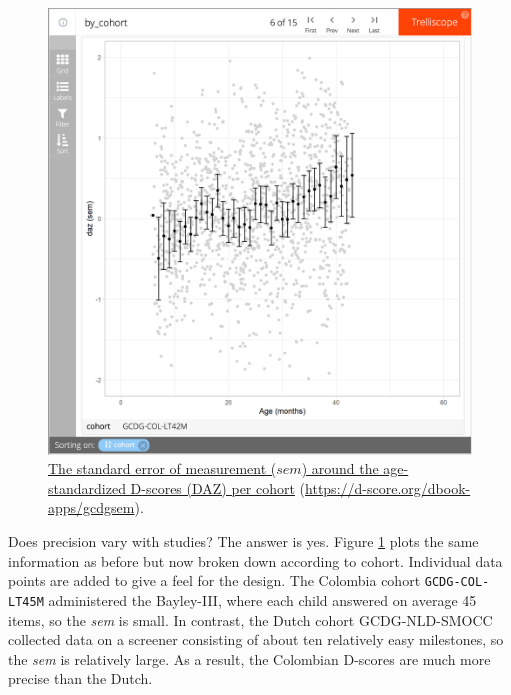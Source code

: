 \documentclass[
]{book}
\begin{document}
\begin{figure}

{\centering \includegraphics[width=1\linewidth]{fig/fig_6.4} 

}

\caption{\href{https://d-score.org/dbook-apps/gcdgsem/\#display=by_cohort\&nrow=1\&ncol=1\&arr=row\&pg=6\&labels=cohort\&sort=cohort;asc\&filter=\&sidebar=\&fv=}{The standard error of measurement (\(sem\)) around the age-standardized D-scores (DAZ) per cohort} (\url{https://d-score.org/dbook-apps/gcdgsem}).}\label{fig:dscoresems}
\end{figure}



Does precision vary with studies? The answer is yes. Figure \ref{fig:dscoresems} plots the same information as before but now broken down according to cohort. Individual data points are added to give a feel for the design. The Colombia cohort \texttt{GCDG-COL-LT45M} administered the Bayley-III, where each child answered on average 45 items, so the \emph{sem} is small. In contrast, the Dutch cohort GCDG-NLD-SMOCC collected data on a screener consisting of about ten relatively easy milestones, so the \emph{sem} is relatively large. As a result, the Colombian D-scores are much more precise than the Dutch.
\end{document}
